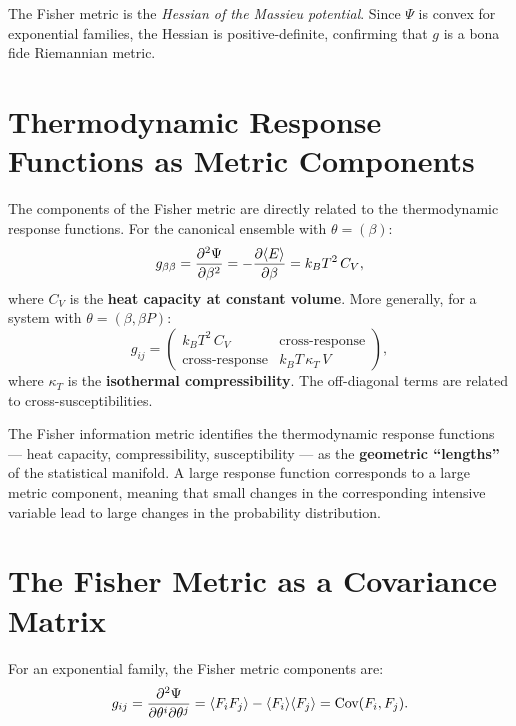 The Fisher metric is the \emph{Hessian of the Massieu potential}. Since $\Psi$ is convex for exponential families, the Hessian is positive-definite, confirming that $g$ is a bona fide Riemannian metric.

\section{Thermodynamic Response Functions as Metric Components}

The components of the Fisher metric are directly related to the thermodynamic response functions. For the canonical ensemble with $\theta = (\beta)$:
\begin{equation}
g_{\beta\beta} = \pdv[2]{\Psi}{\beta} = -\pdv{\langle E \rangle}{\beta} = k_B T^2\,C_V,
\end{equation}
where $C_V$ is the \textbf{heat capacity at constant volume}. More generally, for a system with $\theta = (\beta, \beta P)$:
\begin{equation}
g_{ij} = \begin{pmatrix}
k_B T^2\,C_V & \text{cross-response} \\
\text{cross-response} & k_B T\,\kappa_T\,V
\end{pmatrix},
\end{equation}
where $\kappa_T$ is the \textbf{isothermal compressibility}. The off-diagonal terms are related to cross-susceptibilities.

\begin{proposition}
The Fisher information metric identifies the thermodynamic response functions --- heat capacity, compressibility, susceptibility --- as the \textbf{geometric ``lengths''} of the statistical manifold. A large response function corresponds to a large metric component, meaning that small changes in the corresponding intensive variable lead to large changes in the probability distribution.
\end{proposition}

\section{The Fisher Metric as a Covariance Matrix}

For an exponential family, the Fisher metric components are:
\begin{equation}
g_{ij} = \pdv[2]{\Psi}{\theta^i}{\theta^j} = \langle F_i F_j \rangle - \langle F_i \rangle\langle F_j \rangle = \text{Cov}(F_i, F_j).
\end{equation}

